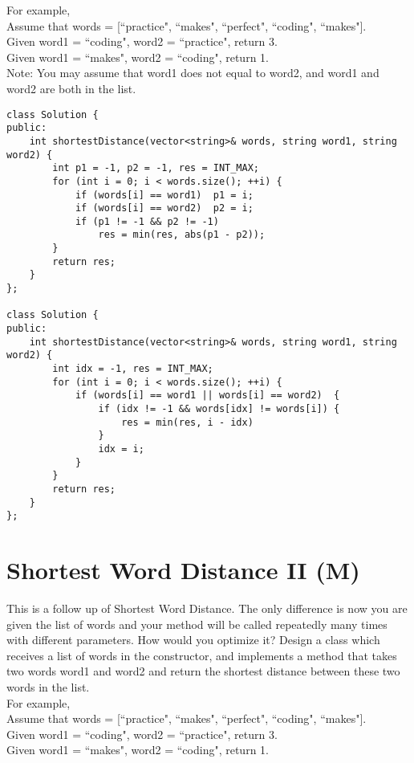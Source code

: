 For example,\\
Assume that words = [``practice", ``makes", ``perfect", ``coding", ``makes"].\\
Given word1 = ``coding", word2 = ``practice", return 3.\\
Given word1 = ``makes", word2 = ``coding", return 1.\\

Note: You may assume that word1 does not equal to word2, and word1 and word2 are both in the list.\\

\begin{lstlisting}
class Solution {
public:
    int shortestDistance(vector<string>& words, string word1, string word2) {
        int p1 = -1, p2 = -1, res = INT_MAX;
        for (int i = 0; i < words.size(); ++i) {
            if (words[i] == word1)  p1 = i;
            if (words[i] == word2)  p2 = i;
            if (p1 != -1 && p2 != -1)
                res = min(res, abs(p1 - p2));
        }
        return res;
    }
};

class Solution {
public:
    int shortestDistance(vector<string>& words, string word1, string word2) {
        int idx = -1, res = INT_MAX;
        for (int i = 0; i < words.size(); ++i) {
            if (words[i] == word1 || words[i] == word2)  {
                if (idx != -1 && words[idx] != words[i]) {
                    res = min(res, i - idx)
                }
                idx = i;
            }
        }
        return res;
    }
};
\end{lstlisting}


\section{Shortest Word Distance II (M)}
This is a follow up of Shortest Word Distance. The only difference is now you are given the list of words and your method will be called repeatedly many times with different parameters. How would you optimize it? Design a class which receives a list of words in the constructor, and implements a method that takes two words word1 and word2 and return the shortest distance between these two words in the list.\\

For example,\\
Assume that words = [``practice", ``makes", ``perfect", ``coding", ``makes"].\\
Given word1 = ``coding", word2 = ``practice", return 3.\\
Given word1 = ``makes", word2 = ``coding", return 1.\\

